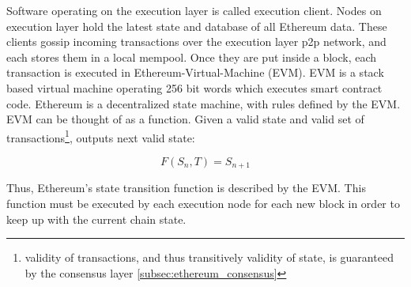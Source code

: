 Software operating on the execution layer is called execution client. Nodes on
execution layer hold the latest state and database of all Ethereum data. These
clients gossip incoming transactions over the execution layer p2p network, and
each stores them in a local mempool. Once they are put inside a block, each
transaction is executed in Ethereum-Virtual-Machine (EVM). EVM is a stack based
virtual machine operating 256 bit words which executes smart contract code.
Ethereum is a decentralized state machine, with rules defined by the EVM.
EVM can be thought of as a function. Given a valid state and valid set of
transactions\footnote{validity of transactions, and thus transitively validity
of state, is guaranteed by the consensus layer \ref{subsec:ethereum_consensus}},
outputs next valid state:

\[
F(S_n, T) = S_{n+1}
\]

Thus, Ethereum's state transition function is described by the EVM. This function
must be executed by each execution node for each new block in order to keep up
with the current chain state. \cite{ethereumEthereumVirtual}


